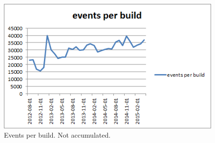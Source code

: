 \begin{figure}[h!]
\centering
\includegraphics[]{figure/events_per_build.png}
\caption{Events per build. Not accumulated.}
\label{fig:events_per_build}
\end{figure}

